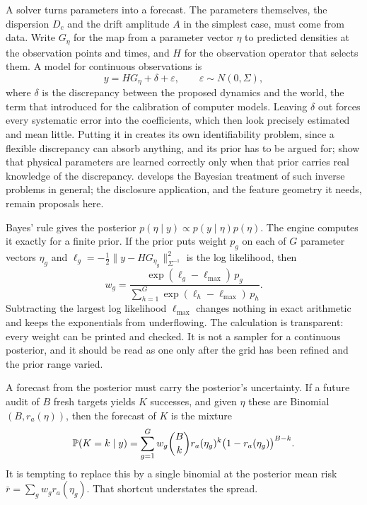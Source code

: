 A solver turns parameters into a forecast. The parameters themselves, the dispersion $D_c$ and
the drift amplitude $A$ in the simplest case, must come from data. Write $G_\eta$ for the map from
a parameter vector $\eta$ to predicted densities at the observation points and times, and $H$ for
the observation operator that selects them. A model for continuous observations is
\begin{equation}\label{c20:eq-obs}
y=HG_\eta+\delta+\varepsilon,\qquad\varepsilon\sim N(0,\Sigma),
\end{equation}
where $\delta$ is the discrepancy between the proposed dynamics and the world, the term that
\citet{kennedy2001} introduced for the calibration of computer models. Leaving
$\delta$ out forces every systematic error into the coefficients, which then look precisely estimated
and mean little. Putting it in creates its own identifiability problem, since a flexible discrepancy can absorb anything, and its prior has to be argued for; \citet{brynjarsdottir2014}
show that physical parameters are learned correctly only when that prior carries real
knowledge of the discrepancy. \citet{stuart2010} develops the Bayesian treatment of such
inverse problems in general; the disclosure application, and the feature geometry it needs,
remain proposals here.

Bayes' rule gives the posterior $p(\eta\mid y)\propto p(y\mid\eta)p(\eta)$. The engine computes it exactly
for a finite prior. If the prior puts weight $p_g$ on each of $G$ parameter vectors $\eta_g$ and $\ell_g=-\tfrac12\|y-HG_{\eta_g}\|^2_{\Sigma^{-1}}$ is the log likelihood, then
\begin{equation}\label{c20:eq-post}
w_g=\frac{\exp(\ell_g-\ell_{\max})\,p_g}{\sum_{h=1}^{G}\exp(\ell_h-\ell_{\max})\,p_h}.
\end{equation}
Subtracting the largest log likelihood $\ell_{\max}$ changes nothing in exact arithmetic and keeps
the exponentials from underflowing. The calculation is transparent: every weight can be
printed and checked. It is not a sampler for a continuous posterior, and it should be read as
one only after the grid has been refined and the prior range varied.

A forecast from the posterior must carry the posterior's uncertainty. If a future audit of
$B$ fresh targets yields $K$ successes, and given $\eta$ these are Binomial$(B,r_a(\eta))$, then the forecast
of $K$ is the mixture
\begin{equation}\label{c20:eq-mix}
\mathbb{P}(K=k\mid y)=\sum_{g=1}^{G}w_g\binom Bk r_a(\eta_g)^k\big(1-r_a(\eta_g)\big)^{B-k}.
\end{equation}
It is tempting to replace this by a single binomial at the posterior mean risk $\bar r=\sum_gw_gr_a(\eta_g)$.
That shortcut understates the spread.

